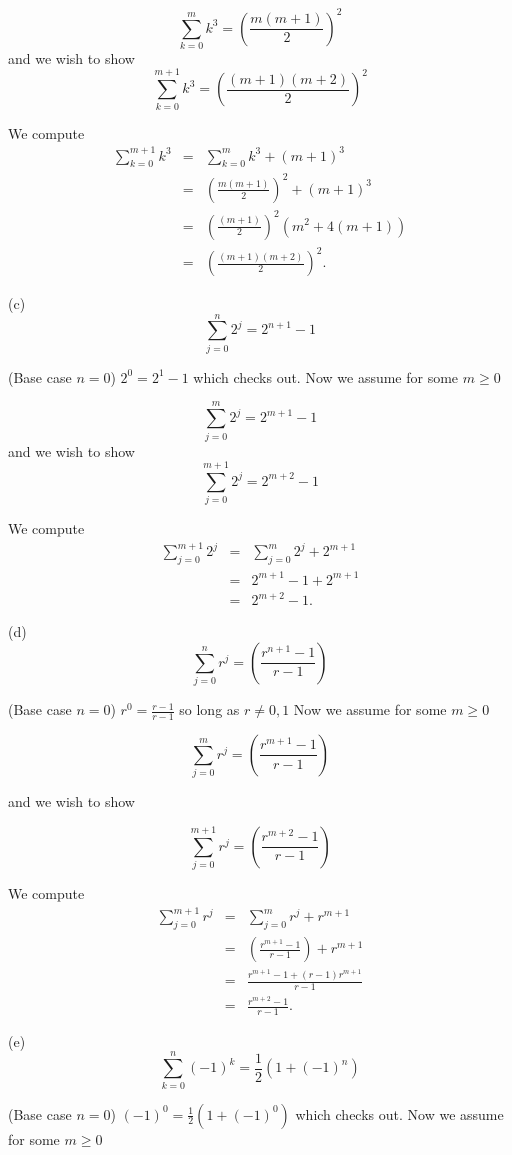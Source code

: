 \documentclass[16 pt]{amsart}
\theoremstyle{definition}
\theoremstyle{remark}
\numberwithin{equation}{subsection}
\begin{document}
\[
\sum_{k=0}^{m} k^3 = \left(\frac{m(m+1)}{2}\right)^2
\]
and we wish to show
\[
\sum_{k=0}^{m+1} k^3 = \left(\frac{(m+1)(m+2)}{2}\right)^2
\]

We compute
\begin{eqnarray}
\sum_{k=0}^{m+1} k^3 & = & \sum_{k=0}^{m} k^3 + (m+1)^3 \nonumber \\
& = & \left(\frac{m(m+1)}{2}\right)^2 + (m+1)^3 \nonumber \\
& = & \left(\frac{(m+1)}{2}\right)^2 (m^2 + 4(m+1))\nonumber \\
& = & \left(\frac{(m+1)(m+2)}{2}\right)^2. \nonumber
\end{eqnarray}


(c) 
\[
\sum_{j=0}^{n} 2^j = 2^{n+1}-1
\]


(Base case $n=0$) $2^0 = 2^1-1$ which checks out.  Now we assume for some $m\ge 0$

\[
\sum_{j=0}^{m} 2^j = 2^{m+1}-1
\]
and we wish to show
\[
\sum_{j=0}^{m+1} 2^j = 2^{m+2}-1
\]

We compute
\begin{eqnarray}
\sum_{j=0}^{m+1} 2^j & = & \sum_{j=0}^{m} 2^j + 2^{m+1} \nonumber\\
& = & 2^{m+1}-1 + 2^{m+1} \nonumber\\
& = & 2^{m+2} - 1. \nonumber
\end{eqnarray}

(d)
\[
\sum_{j=0}^{n} r^j = \left(\frac{r^{n+1}-1}{r-1}\right)
\]


(Base case $n=0$) $r^0 = \frac{r-1}{r-1}$ so long as $r\ne0,1$  Now we assume for some $m\ge 0$

\[
\sum_{j=0}^{m} r^j = \left(\frac{r^{m+1}-1}{r-1}\right)
\]

and we wish to show

\[
\sum_{j=0}^{m+1} r^j = \left(\frac{r^{m+2}-1}{r-1}\right)
\]


We compute
\begin{eqnarray}
\sum_{j=0}^{m+1} r^j & = & \sum_{j=0}^{m}r^j + r^{m+1}\nonumber \\
& = & \left(\frac{r^{m+1}-1}{r-1}\right) + r^{m+1} \nonumber\\
& = & \frac{r^{m+1}-1 + (r-1)r^{m+1}}{r-1} \nonumber\\
& = & \frac{r^{m+2}-1}{r-1}\nonumber.
\end{eqnarray}


(e)
\[
\sum_{k=0}^n (-1)^k = \frac{1}{2}(1+(-1)^n)
\]

(Base case $n=0$) $(-1)^0 = \frac{1}{2}(1+(-1)^0)$ which checks out.  Now we assume for some $m\ge 0$
\end{document}
